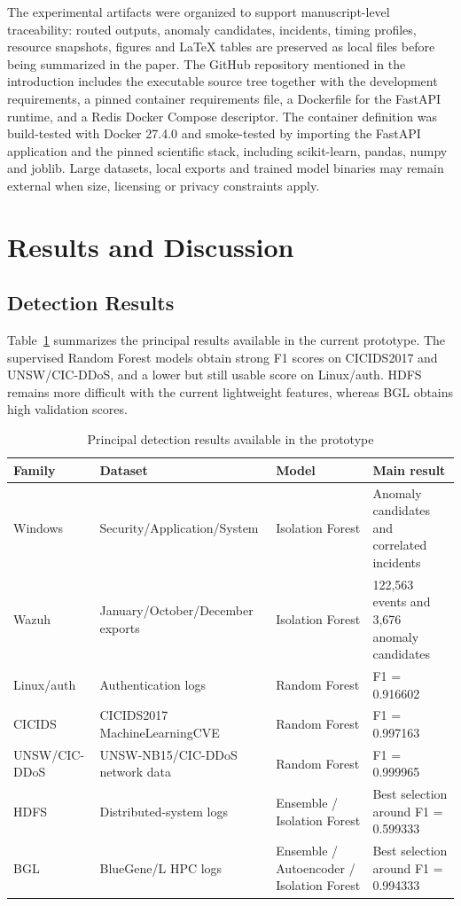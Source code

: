 \documentclass[conference]{IEEEtran}
\begin{document}
The experimental artifacts were organized to support manuscript-level traceability: routed outputs, anomaly candidates, incidents, timing profiles, resource snapshots, figures and LaTeX tables are preserved as local files before being summarized in the paper. The GitHub repository mentioned in the introduction includes the executable source tree together with the development requirements, a pinned container requirements file, a Dockerfile for the FastAPI runtime, and a Redis Docker Compose descriptor. The container definition was build-tested with Docker 27.4.0 and smoke-tested by importing the FastAPI application and the pinned scientific stack, including scikit-learn, pandas, numpy and joblib. Large datasets, local exports and trained model binaries may remain external when size, licensing or privacy constraints apply.

\section{Results and Discussion}
\subsection{Detection Results}
Table~\ref{tab:results} summarizes the principal results available in the current prototype. The supervised Random Forest models obtain strong F1 scores on CICIDS2017 and UNSW/CIC-DDoS, and a lower but still usable score on Linux/auth. HDFS remains more difficult with the current lightweight features, whereas BGL obtains high validation scores.

\begin{table}[t]
\caption{Principal detection results available in the prototype}
\label{tab:results}
\centering
\scriptsize
\begin{tabularx}{\textwidth}{p{2.0cm}p{3.4cm}p{3.2cm}X}
\toprule
\textbf{Family} & \textbf{Dataset} & \textbf{Model} & \textbf{Main result} \\
\midrule
Windows & Security/Application/System & Isolation Forest & Anomaly candidates and correlated incidents \\
Wazuh & January/October/December exports & Isolation Forest & 122,563 events and 3,676 anomaly candidates \\
Linux/auth & Authentication logs & Random Forest & F1 = 0.916602 \\
CICIDS & CICIDS2017 MachineLearningCVE & Random Forest & F1 = 0.997163 \\
UNSW/CIC-DDoS & UNSW-NB15/CIC-DDoS network data & Random Forest & F1 = 0.999965 \\
HDFS & Distributed-system logs & Ensemble / Isolation Forest & Best selection around F1 = 0.599333 \\
BGL & BlueGene/L HPC logs & Ensemble / Autoencoder / Isolation Forest & Best selection around F1 = 0.994333 \\
\bottomrule
\end{tabularx}
\end{table}
\end{document}
